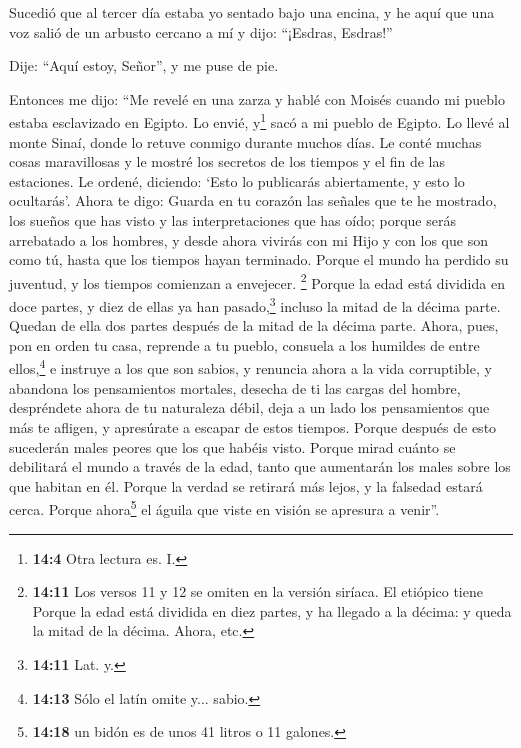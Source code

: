  Sucedió que al tercer día estaba yo sentado bajo una
encina, y he aquí que una voz salió de un arbusto cercano a mí y dijo:
``¡Esdras, Esdras!''

 Dije: ``Aquí estoy, Señor'', y me puse de pie.

 Entonces me dijo: ``Me revelé en una zarza y hablé con
Moisés cuando mi pueblo estaba esclavizado en Egipto.  Lo
envié, y\footnote{\textbf{14:4} Otra lectura es. I.} sacó a mi pueblo de
Egipto. Lo llevé al monte Sinaí, donde lo retuve conmigo durante muchos
días.  Le conté muchas cosas maravillosas y le mostré los
secretos de los tiempos y el fin de las estaciones. Le ordené, diciendo:
 `Esto lo publicarás abiertamente, y esto lo ocultarás'.
 Ahora te digo:  Guarda en tu corazón las
señales que te he mostrado, los sueños que has visto y las
interpretaciones que has oído;  porque serás arrebatado a
los hombres, y desde ahora vivirás con mi Hijo y con los que son como
tú, hasta que los tiempos hayan terminado.  Porque el
mundo ha perdido su juventud, y los tiempos comienzan a envejecer.
 \footnote{\textbf{14:11} Los versos 11 y 12 se omiten en
  la versión siríaca. El etiópico tiene Porque la edad está dividida en
  diez partes, y ha llegado a la décima: y queda la mitad de la décima.
  Ahora, etc.} Porque la edad está dividida en doce partes, y diez de
ellas ya han pasado,\footnote{\textbf{14:11} Lat. y.} incluso la mitad
de la décima parte.  Quedan de ella dos partes después de
la mitad de la décima parte.  Ahora, pues, pon en orden
tu casa, reprende a tu pueblo, consuela a los humildes de entre
ellos,\footnote{\textbf{14:13} Sólo el latín omite y... sabio.} e
instruye a los que son sabios, y renuncia ahora a la vida corruptible,
 y abandona los pensamientos mortales, desecha de ti las
cargas del hombre, despréndete ahora de tu naturaleza débil,
 deja a un lado los pensamientos que más te afligen, y
apresúrate a escapar de estos tiempos.  Porque después de
esto sucederán males peores que los que habéis visto. 
Porque mirad cuánto se debilitará el mundo a través de la edad, tanto
que aumentarán los males sobre los que habitan en él. 
Porque la verdad se retirará más lejos, y la falsedad estará cerca.
Porque ahora\footnote{\textbf{14:18} un bidón es de unos 41 litros o 11
  galones.} el águila que viste en visión se apresura a venir''.

